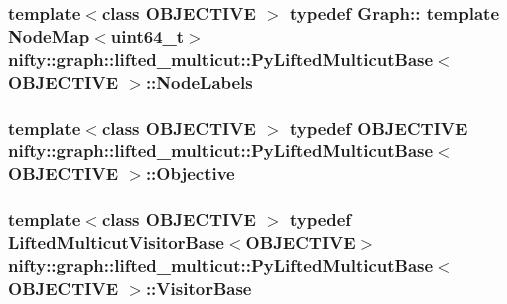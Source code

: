 \subsubsection[{Node\+Labels}]{\setlength{\rightskip}{0pt plus 5cm}template$<$class O\+B\+J\+E\+C\+T\+I\+V\+E $>$ typedef Graph\+:: template Node\+Map$<$uint64\+\_\+t$>$ {\bf nifty\+::graph\+::lifted\+\_\+multicut\+::\+Py\+Lifted\+Multicut\+Base}$<$ O\+B\+J\+E\+C\+T\+I\+V\+E $>$\+::{\bf Node\+Labels}}\label{classnifty_1_1graph_1_1lifted__multicut_1_1PyLiftedMulticutBase_ad79cf52f6bcbd7cfd9c8675d976b8a85}
\hypertarget{classnifty_1_1graph_1_1lifted__multicut_1_1PyLiftedMulticutBase_a1de54ff09e3f51a6c6bc92148e78ad44}{}
\subsubsection[{Objective}]{\setlength{\rightskip}{0pt plus 5cm}template$<$class O\+B\+J\+E\+C\+T\+I\+V\+E $>$ typedef O\+B\+J\+E\+C\+T\+I\+V\+E {\bf nifty\+::graph\+::lifted\+\_\+multicut\+::\+Py\+Lifted\+Multicut\+Base}$<$ O\+B\+J\+E\+C\+T\+I\+V\+E $>$\+::{\bf Objective}}\label{classnifty_1_1graph_1_1lifted__multicut_1_1PyLiftedMulticutBase_a1de54ff09e3f51a6c6bc92148e78ad44}
\hypertarget{classnifty_1_1graph_1_1lifted__multicut_1_1PyLiftedMulticutBase_a94d88bd4d7bf09e48fe8a89108f35070}{}
\subsubsection[{Visitor\+Base}]{\setlength{\rightskip}{0pt plus 5cm}template$<$class O\+B\+J\+E\+C\+T\+I\+V\+E $>$ typedef {\bf Lifted\+Multicut\+Visitor\+Base}$<$O\+B\+J\+E\+C\+T\+I\+V\+E$>$ {\bf nifty\+::graph\+::lifted\+\_\+multicut\+::\+Py\+Lifted\+Multicut\+Base}$<$ O\+B\+J\+E\+C\+T\+I\+V\+E $>$\+::{\bf Visitor\+Base}}\label{classnifty_1_1graph_1_1lifted__multicut_1_1PyLiftedMulticutBase_a94d88bd4d7bf09e48fe8a89108f35070}


